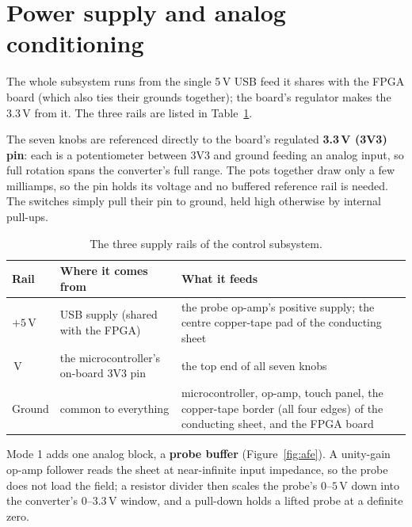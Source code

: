 \documentclass[11pt]{report}
\begin{document}
\section{Power supply and analog conditioning}

The whole subsystem runs from the single 5\,V USB feed it shares with the FPGA board (which also ties their grounds together); the board's regulator makes the 3.3\,V from it. The three rails are listed in Table~\ref{tab:rails}.

The seven knobs are referenced directly to the board's regulated \textbf{3.3\,V (3V3) pin}: each is a potentiometer between 3V3 and ground feeding an analog input, so full rotation spans the converter's full range. The pots together draw only a few milliamps, so the pin holds its voltage and no buffered reference rail is needed. The switches simply pull their pin to ground, held high otherwise by internal pull-ups.

\begin{table}[ht]
\centering
\renewcommand{\arraystretch}{1.25}
\begin{tabularx}{\textwidth}{@{}>{\raggedright\arraybackslash}p{3.3cm} >{\raggedright\arraybackslash}X >{\raggedright\arraybackslash}X@{}}
\toprule
\textbf{Rail} & \textbf{Where it comes from} & \textbf{What it feeds} \\
\midrule
$+5$\,V & USB supply (shared with the FPGA) & the probe op-amp's positive supply; the centre copper-tape pad of the conducting sheet \\
3.3\,V & the microcontroller's on-board 3V3 pin & the top end of all seven knobs \\
Ground & common to everything & microcontroller, op-amp, touch panel, the copper-tape border (all four edges) of the conducting sheet, and the FPGA board \\
\bottomrule
\end{tabularx}
\caption{The three supply rails of the control subsystem.}
\label{tab:rails}
\end{table}

Mode 1 adds one analog block, a \textbf{probe buffer} (Figure~\ref{fig:afe}). A unity-gain op-amp follower reads the sheet at near-infinite input impedance, so the probe does not load the field; a resistor divider then scales the probe's $0$--$5$\,V down into the converter's $0$--$3.3$\,V window, and a pull-down holds a lifted probe at a definite zero.
\end{document}

